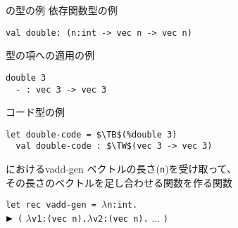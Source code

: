 \documentclass[dvipdfmx,aspectratio=169, 20pt]{beamer}
\begin{document}
\begin{frame}[fragile]{\LMD の型の例}
    依存関数型の例
    \begin{exampleblock}{}
        \begin{Verbatim}[commandchars=\\\{\},codes={\catcode`$=3\catcode`^=7}]
  val double: (n:int -> vec n -> vec n)
        \end{Verbatim}
    \end{exampleblock}
    型の項への適用の例
    \begin{exampleblock}{}
        \begin{Verbatim}[commandchars=\\\{\},codes={\catcode`$=3\catcode`^=7}]
  double 3
  - : vec 3 -> vec 3
        \end{Verbatim}
    \end{exampleblock}
    コード型の例
    \begin{exampleblock}{}
        \begin{Verbatim}[commandchars=\\\{\},codes={\catcode`$=3\catcode`^=7}]
  let double-code = $\TB$(%double 3)
  val double-code : $\TW$(vec 3 -> vec 3)
        \end{Verbatim}
    \end{exampleblock}
\end{frame}

\begin{frame}[fragile]{\LMD におけるvadd-gen}
    ベクトルの長さ(\verb|n|)を受け取って、\\その長さのベクトルを足し合わせる関数を作る関数
    \begin{exampleblock}{}
        \hspace{5mm} \verb|let rec vadd-gen = |$\lambda$\verb|n:int.| \\
        \hspace{10mm} ${\mathop{\blacktriangleright}}$ \verb|(| $\lambda$\verb|v1:(vec |\onslide<2->{\underline{\%}}\verb|n).|$\lambda$\verb|v2:(vec |\verb|n).| ... \verb|)|
    \end{exampleblock}
\end{frame}
\end{document}
